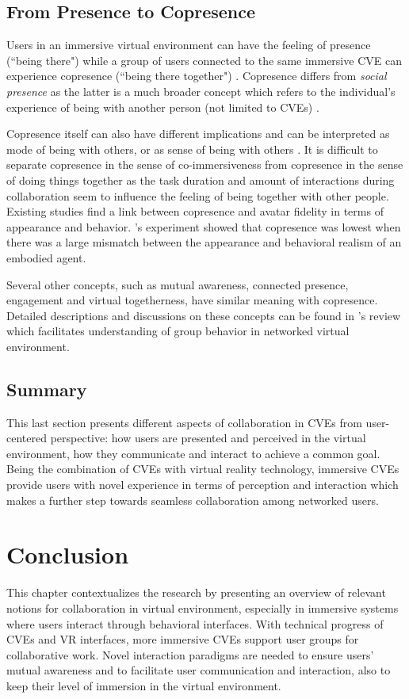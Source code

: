 \subsection{From Presence to Copresence}
Users in an immersive virtual environment can have the feeling of presence (``being there") while a group of users connected to the same immersive CVE can experience copresence (``being there together") \citep{Slater2000Small}. Copresence differs from \textit{social presence} as the latter is a much broader concept which refers to the individual's experience of being with another person (not limited to CVEs) \citep{Schroeder2002Copresence}.

Copresence itself can also have different implications and can be interpreted as mode of being with others, or as sense of being with others \citep{Zhao2003Taxonomy}. It is difficult to separate copresence in the sense of co-immersiveness from copresence in the sense of doing things together \citep{Schroeder2002Copresence} as the task duration and amount of interactions during collaboration seem to influence the feeling of being together with other people. Existing studies \citep{Slater2002Meeting, Garau2003Thesis} find a link between copresence and avatar fidelity in terms of appearance and behavior. \citet{Bailenson2005Copresence}'s experiment showed that copresence was lowest when there was a large mismatch between the appearance and behavioral realism of an embodied agent.

Several other concepts, such as mutual awareness, connected presence, engagement and virtual togetherness, have similar meaning with copresence. Detailed descriptions and discussions on these concepts can be found in \citet{Schroeder2006Being}'s review which facilitates understanding of group behavior in networked virtual environment. 


\subsection{Summary}
This last section presents different aspects of collaboration in CVEs from user-centered perspective: how users are presented and perceived in the virtual environment, how they communicate and interact to achieve a common goal. Being the combination of CVEs with virtual reality technology, immersive CVEs provide users with novel experience in terms of perception and interaction which makes a further step towards seamless collaboration among networked users. 


\section{Conclusion}
This chapter contextualizes the research by presenting an overview of relevant notions for collaboration in virtual environment, especially in immersive systems where users interact through behavioral interfaces. With technical progress of CVEs and VR interfaces, more immersive CVEs support user groups for collaborative work. Novel interaction paradigms are needed to ensure users' mutual awareness and to facilitate user communication and interaction, also to keep their level of immersion in the virtual environment. 

